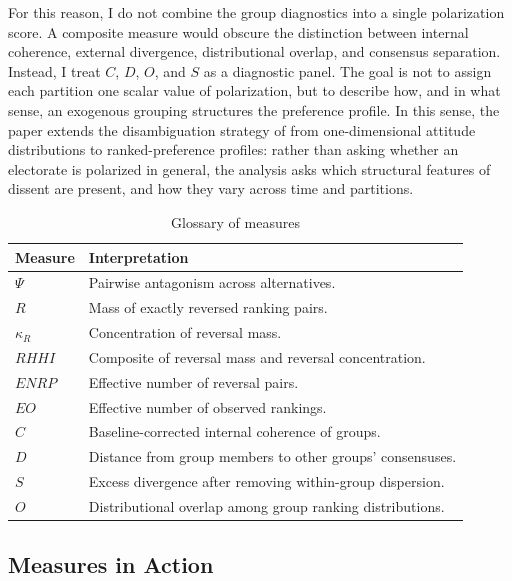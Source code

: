 \documentclass[12pt]{article}
\begin{document}
For this reason, I do not combine the group diagnostics into a single polarization score. A composite measure would obscure the distinction between internal coherence, external divergence, distributional overlap, and consensus separation. Instead, I treat \(C\), \(D\), \(O\), and \(S\) as a diagnostic panel. The goal is not to assign each partition one scalar value of polarization, but to describe how, and in what sense, an exogenous grouping structures the preference profile. In this sense, the paper extends the disambiguation strategy of \textcite{bramson2017understanding, bramson16_disam_social_polar_concep_measur} from one-dimensional attitude distributions to ranked-preference profiles: rather than asking whether an electorate is polarized in general, the analysis asks which structural features of dissent are present, and how they vary across time and partitions.

\begin{table}[htbp]
\centering
\caption{Glossary of measures}
\label{tab:measure-glossary}
\small
\begin{tabular}{@{} l p{} @{}}
\toprule
\textbf{Measure} & \textbf{Interpretation} \\
\midrule
\(\Psi\) & Pairwise antagonism across alternatives. \\
\(R\) & Mass of exactly reversed ranking pairs. \\
\(\kappa_R\) & Concentration of reversal mass. \\
\(RHHI\) & Composite of reversal mass and reversal concentration. \\
\(ENRP\) & Effective number of reversal pairs. \\
\(EO\) & Effective number of observed rankings. \\
\(C\) & Baseline-corrected internal coherence of groups. \\
\(D\) & Distance from group members to other groups' consensuses. \\
\(S\) & Excess divergence after removing within-group dispersion. \\
\(O\) & Distributional overlap among group ranking distributions. 

\end{tabular}
\end{table}



\subsection{Measures in Action}
\end{document}
